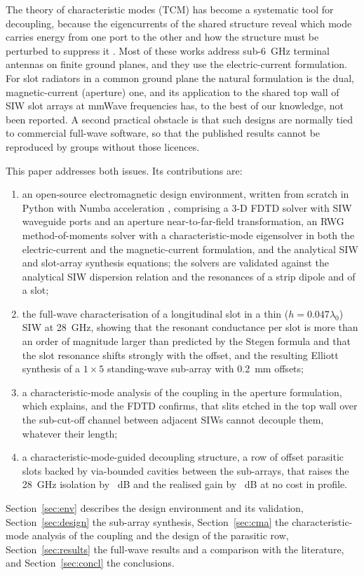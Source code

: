 \documentclass[preprint,12pt]{elsarticle}
\begin{document}
The theory of characteristic modes (TCM) \cite{harrington1971,harrington1971b,cabedo2007,chen2015,ylaoijala2019} has become a systematic tool for decoupling, because the eigencurrents of the shared structure reveal which mode carries energy from one port to the other and how the structure must be perturbed to suppress it \cite{lai2023self,sun2021cmdm,fritz2020,cao2022,qu2023,chen2024lc}. Most of these works address sub-6~GHz terminal antennas on finite ground planes, and they use the electric-current formulation. For slot radiators in a common ground plane the natural formulation is the dual, magnetic-current (aperture) one, and its application to the shared top wall of SIW slot arrays at mmWave frequencies has, to the best of our knowledge, not been reported. A second practical obstacle is that such designs are normally tied to commercial full-wave software, so that the published results cannot be reproduced by groups without those licences.

This paper addresses both issues. Its contributions are:
\begin{enumerate}
\item an open-source electromagnetic design environment, written from scratch in Python with Numba acceleration \cite{lam2015numba}, comprising a 3-D FDTD solver \cite{taflove2005,roden2000} with SIW waveguide ports and an aperture near-to-far-field transformation, an RWG method-of-moments solver \cite{rwg1982} with a characteristic-mode eigensolver in both the electric-current and the magnetic-current formulation, and the analytical SIW and slot-array synthesis equations; the solvers are validated against the analytical SIW dispersion relation and the resonances of a strip dipole and of a slot;
\item the full-wave characterisation of a longitudinal slot in a thin ($h = 0.047\lambda_0$) SIW at 28~GHz, showing that the resonant conductance per slot is more than an order of magnitude larger than predicted by the Stegen formula and that the slot resonance shifts strongly with the offset, and the resulting Elliott synthesis of a $1\times5$ standing-wave sub-array with 0.2~mm offsets;
\item a characteristic-mode analysis of the coupling in the aperture formulation, which explains, and the FDTD confirms, that slits etched in the top wall over the sub-cut-off channel between adjacent SIWs cannot decouple them, whatever their length;
\item a characteristic-mode-guided decoupling structure, a row of offset parasitic slots backed by via-bounded cavities between the sub-arrays, that raises the 28~GHz isolation by \IsoGain~dB and the realised gain by \GainDelta~dB at no cost in profile.
\end{enumerate}
Section~\ref{sec:env} describes the design environment and its validation, Section~\ref{sec:design} the sub-array synthesis, Section~\ref{sec:cma} the characteristic-mode analysis of the coupling and the design of the parasitic row, Section~\ref{sec:results} the full-wave results and a comparison with the literature, and Section~\ref{sec:concl} the conclusions.
\end{document}
